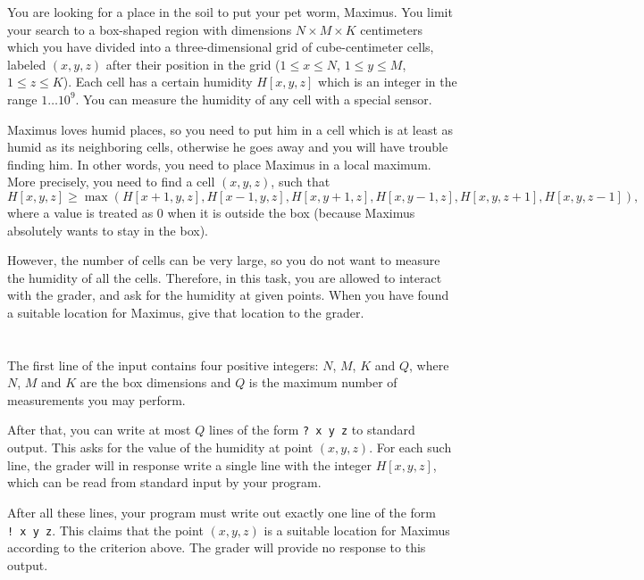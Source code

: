 \ifx\boi\undefined\fi
\def\version{jury-1}

You are looking for a place in the soil to put your pet worm, Maximus. You limit your search to a box-shaped region with dimensions $N \times M \times K$ centimeters which you have divided into a three-dimensional grid of cube-centimeter cells, labeled $(x,y,z)$ after their position in the grid ($1 \le x \le N$, $1 \le y \le M$, $1 \le z \le K$). Each cell has a certain humidity $H[x,y,z]$ which is an integer in the range $1 \dots 10^9$. You can measure the humidity of any cell with a special sensor.

Maximus loves humid places, so you need to put him in a cell which is at least as humid as its neighboring cells, otherwise he goes away and you will have trouble finding him.
In other words, you need to place Maximus in a local maximum.
More precisely, you need to find a cell $(x,y,z)$, such that
$$
H[x,y,z] \ge \max(H[x+1,y,z], H[x-1,y,z], H[x,y+1,z], H[x,y-1,z], H[x,y,z+1], H[x,y,z-1]),
$$
where a value is treated as $0$ when it is outside the box (because Maximus absolutely wants to stay in the box).

However, the number of cells can be very large, so you do not want to measure the humidity of all the cells. Therefore, in this task, you are allowed to interact with the grader, and ask for the humidity at given points.
When you have found a suitable location for Maximus, give that location to the grader.

\section*{\interactivity}
The first line of the input contains four positive integers: $N$, $M$, $K$ and $Q$, where $N$, $M$ and $K$ are the box dimensions and $Q$ is the maximum number of measurements you may perform.

After that, you can write at most $Q$ lines of the form \texttt{?\ x y z} to standard output.
This asks for the value of the humidity at point $(x, y, z)$.
For each such line, the grader will in response write a single line with the integer $H[x,y,z]$, which can be read from standard input by your program.

After all these lines, your program must write out exactly one line of the form \texttt{!\ x y z}.
This claims that the point $(x, y, z)$ is a suitable location for Maximus according to the criterion above.
The grader will provide no response to this output.

